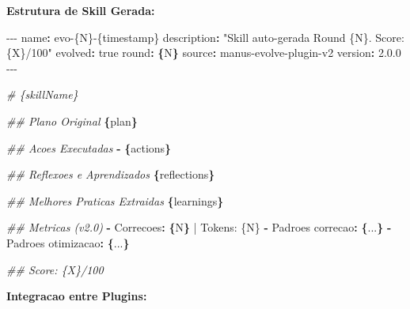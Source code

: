 \documentclass[
  12pt,
]{article}
\newenvironment{Shaded}{}{}
\newcommand{\AttributeTok}[1]{\textcolor[rgb]{0.49,0.56,0.16}{#1}}
\newcommand{\CharTok}[1]{\textcolor[rgb]{0.25,0.44,0.63}{#1}}
\newcommand{\CommentTok}[1]{\textcolor[rgb]{0.38,0.63,0.69}{\textit{#1}}}
\newcommand{\FloatTok}[1]{\textcolor[rgb]{0.25,0.63,0.44}{#1}}
\newcommand{\FunctionTok}[1]{\textcolor[rgb]{0.02,0.16,0.49}{#1}}
\newcommand{\KeywordTok}[1]{\textcolor[rgb]{0.00,0.44,0.13}{\textbf{#1}}}
\newcommand{\PreprocessorTok}[1]{\textcolor[rgb]{0.74,0.48,0.00}{#1}}
\newcommand{\StringTok}[1]{\textcolor[rgb]{0.25,0.44,0.63}{#1}}
\begin{document}
\textbf{Estrutura de Skill Gerada:}

\begin{Shaded}
\begin{Highlighting}[]
\PreprocessorTok{{-}{-}{-}}
\FunctionTok{name}\KeywordTok{:}\AttributeTok{ evo{-}\{N\}{-}\{timestamp\}}
\FunctionTok{description}\KeywordTok{:}\AttributeTok{ }\StringTok{"Skill auto{-}gerada Round \{N\}. Score: \{X\}/100"}
\FunctionTok{evolved}\KeywordTok{:}\AttributeTok{ }\CharTok{true}
\FunctionTok{round}\KeywordTok{:}\AttributeTok{ }\KeywordTok{\{}\AttributeTok{N}\KeywordTok{\}}
\FunctionTok{source}\KeywordTok{:}\AttributeTok{ manus{-}evolve{-}plugin{-}v2}
\FunctionTok{version}\KeywordTok{:}\AttributeTok{ }\FloatTok{2.0.0}
\PreprocessorTok{{-}{-}{-}}

\CommentTok{\# \{skillName\}}

\CommentTok{\#\# Plano Original}
\KeywordTok{\{}\AttributeTok{plan}\KeywordTok{\}}

\CommentTok{\#\# Acoes Executadas}
\KeywordTok{{-}}\AttributeTok{ }\KeywordTok{\{}\AttributeTok{actions}\KeywordTok{\}}

\CommentTok{\#\# Reflexoes e Aprendizados}
\KeywordTok{\{}\AttributeTok{reflections}\KeywordTok{\}}

\CommentTok{\#\# Melhores Praticas Extraidas}
\KeywordTok{\{}\AttributeTok{learnings}\KeywordTok{\}}

\CommentTok{\#\# Metricas (v2.0)}
\KeywordTok{{-}}\AttributeTok{ }\FunctionTok{Correcoes}\KeywordTok{:}\AttributeTok{ }\KeywordTok{\{}\AttributeTok{N}\KeywordTok{\}}\AttributeTok{ | Tokens: \{N\}}
\KeywordTok{{-}}\AttributeTok{ }\FunctionTok{Padroes correcao}\KeywordTok{:}\AttributeTok{ }\KeywordTok{\{}\AttributeTok{...}\KeywordTok{\}}
\KeywordTok{{-}}\AttributeTok{ }\FunctionTok{Padroes otimizacao}\KeywordTok{:}\AttributeTok{ }\KeywordTok{\{}\AttributeTok{...}\KeywordTok{\}}

\CommentTok{\#\# Score: \{X\}/100}
\end{Highlighting}
\end{Shaded}

\textbf{Integracao entre Plugins:}
\end{document}

